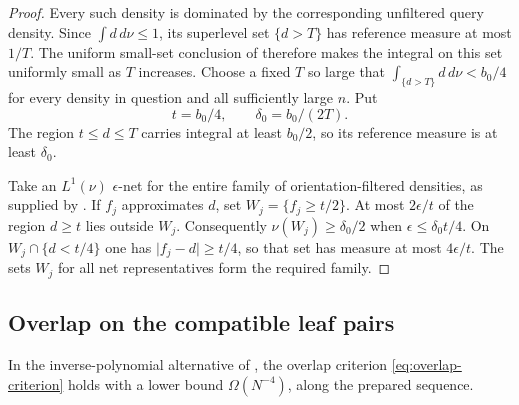 \begin{proof}
Every such density is dominated by the corresponding unfiltered
query density.  Since \(\int d\,d\nu\le1\), its superlevel set
\(\{d>T\}\) has reference measure at most \(1/T\).
The uniform small-set conclusion of 
therefore makes the integral on this set uniformly small as \(T\)
increases.
Choose a fixed \(T\) so large that
\(\int_{\{d>T\}}d\,d\nu<b_0/4\) for every density in question
and all sufficiently large \(n\).
Put
\[
        t=b_0/4,\qquad \delta_0=b_0/(2T).
\]
The region \(t\le d\le T\) carries integral at least \(b_0/2\),
so its reference measure is at least \(\delta_0\).

Take an \(L^1(\nu)\) \(\epsilon\)-net for the entire family of
orientation-filtered densities, as supplied by
.  If \(f_j\) approximates \(d\), set
\(W_j=\{f_j\ge t/2\}\).
At most \(2\epsilon/t\) of the region \(d\ge t\) lies outside \(W_j\).
Consequently \(\nu(W_j)\ge\delta_0/2\) when
\(\epsilon\le\delta_0t/4\).
On \(W_j\cap\{d<t/4\}\) one has
\(\lvert f_j-d\rvert\ge t/4\), so that set has measure at most
\(4\epsilon/t\).
The sets \(W_j\) for all net representatives form the required family.
\end{proof}

\subsection{Overlap on the compatible leaf pairs}

\begin{proposition}
\label{prop:rare-overlap}
In the inverse-polynomial alternative of
, the overlap criterion
\eqref{eq:overlap-criterion} holds with a lower bound
\(\Omega(N^{-4})\), along the prepared sequence.
\end{proposition}

